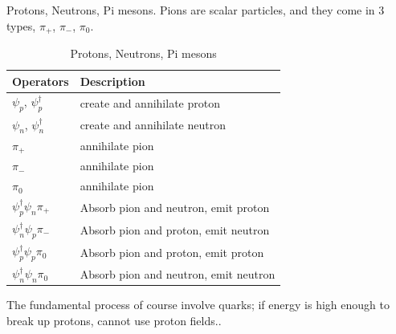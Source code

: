 \documentclass[]{article}
\begin{document}
Protons, Neutrons, Pi mesons. Pions are scalar particles, and they come in 3 types, $\pi_+$, $\pi_-$, $\pi_0$.

\begin{table}[H]
	\begin{center}
		\caption{Protons, Neutrons, Pi mesons}
		\begin{tabular}{|l|l|} \hline
			Operators &Description\\ \hline
			$\psi_p$, $\psi^\dagger_p$& create and annihilate proton\\ \hline
		    $\psi_n$, $\psi^\dagger_n$& create and annihilate neutron\\ \hline
			$\pi_+$& annihilate pion\\ \hline
			$\pi_-$&annihilate pion\\ \hline
			$\pi_0$&annihilate pion\\ \hline
			$\psi^\dagger_p \psi_n \pi_+$&Absorb pion and neutron, emit proton\\ \hline
			$\psi^\dagger_n \psi_p \pi_-$&Absorb pion and proton, emit neutron\\ \hline
			$\psi^\dagger_p \psi_p \pi_0$&Absorb pion and proton, emit proton\\ \hline
			$\psi^\dagger_n \psi_n \pi_0$&Absorb pion and neutron, emit neutron \\ \hline
		\end{tabular}
	\end{center}
\end{table}
The fundamental process of course involve quarks; if energy is high enough to break up protons, cannot use proton fields..
\end{document}
